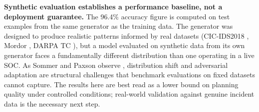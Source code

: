 \textbf{Synthetic evaluation establishes a performance baseline, not a deployment guarantee.} The 96.4\% accuracy figure is computed on test examples from the same generator as the training data. The generator was designed to produce realistic patterns informed by real datasets (CIC-IDS2018 \cite{sharafaldin2018cic}, Mordor \cite{rodriguez2020mordor}, DARPA TC \cite{darpatc}), but a model evaluated on synthetic data from its own generator faces a fundamentally different distribution than one operating in a live SOC. As Sommer and Paxson observe \cite{sommer2010outside}, distribution shift and adversarial adaptation are structural challenges that benchmark evaluations on fixed datasets cannot capture. The results here are best read as a lower bound on planning quality under controlled conditions; real-world validation against genuine incident data is the necessary next step.
